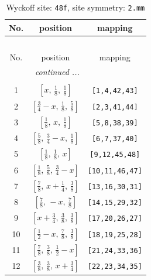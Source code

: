 \documentclass[fleqn,8pt]{jsarticle}
\begin{document}
\begin{longtable}{ccc}
\caption{Wyckoff site: {\tt 48f}, site symmetry: {\tt 2.mm}}
 \\
 \hline \hline
No. & position & mapping \\ \hline \endfirsthead

\multicolumn{2}{l}{\tablename\ \thetable{}} \\
 \hline \hline
No. & position & mapping \\ \hline \endhead

 \hline \hline
\multicolumn{2}{r}{\footnotesize\it continued ...} \\ \endfoot

 \hline \hline
\multicolumn{2}{r}{} \\ \endlastfoot

1 & $\left[ x,\, \frac{1}{8},\, \frac{1}{8} \right]$ & {\tt [1,4,42,43]} \\ \hline
2 & $\left[ \frac{3}{4} - x,\, \frac{1}{8},\, \frac{5}{8} \right]$ & {\tt [2,3,41,44]} \\ \hline
3 & $\left[ \frac{1}{8},\, x,\, \frac{1}{8} \right]$ & {\tt [5,8,38,39]} \\ \hline
4 & $\left[ \frac{5}{8},\, \frac{3}{4} - x,\, \frac{1}{8} \right]$ & {\tt [6,7,37,40]} \\ \hline
5 & $\left[ \frac{1}{8},\, \frac{1}{8},\, x \right]$ & {\tt [9,12,45,48]} \\ \hline
6 & $\left[ \frac{1}{8},\, \frac{5}{8},\, \frac{3}{4} - x \right]$ & {\tt [10,11,46,47]} \\ \hline
7 & $\left[ \frac{7}{8},\, x + \frac{1}{4},\, \frac{3}{8} \right]$ & {\tt [13,16,30,31]} \\ \hline
8 & $\left[ \frac{7}{8},\, - x,\, \frac{7}{8} \right]$ & {\tt [14,15,29,32]} \\ \hline
9 & $\left[ x + \frac{3}{4},\, \frac{3}{8},\, \frac{3}{8} \right]$ & {\tt [17,20,26,27]} \\ \hline
10 & $\left[ \frac{1}{2} - x,\, \frac{7}{8},\, \frac{3}{8} \right]$ & {\tt [18,19,25,28]} \\ \hline
11 & $\left[ \frac{7}{8},\, \frac{3}{8},\, \frac{1}{2} - x \right]$ & {\tt [21,24,33,36]} \\ \hline
12 & $\left[ \frac{3}{8},\, \frac{3}{8},\, x + \frac{3}{4} \right]$ & {\tt [22,23,34,35]} \\
\end{longtable}
\renewcommand{\arraystretch}{1.2}
\end{document}
